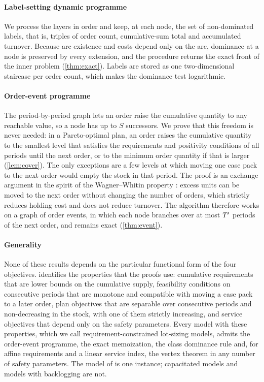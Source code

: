\documentclass[preprint,12pt,authoryear]{elsarticle}
\begin{document}
\paragraph{Label-setting dynamic programme}
We process the layers in order and keep, at each node, the set of non-dominated labels,
that is, triples of order count, cumulative-sum total and accumulated turnover. Because
arc existence and costs depend only on the arc, dominance at a node is preserved by every
extension, and the procedure returns the exact front of the inner problem
(\cref{thm:exact}). Labels are stored as one two-dimensional staircase per order count,
which makes the dominance test logarithmic.

\paragraph{Order-event programme}
The period-by-period graph lets an order raise the cumulative quantity to any reachable
value, so a node has up to $S$ successors. We prove that this freedom is never needed: in a
Pareto-optimal plan, an order raises the cumulative quantity to the smallest level that
satisfies the requirements and positivity conditions of all periods until the next order,
or to the minimum order quantity if that is larger (\cref{lem:cover}). The only exceptions
are a few levels at which moving one case pack to the next order would empty the stock in
that period. The proof is an exchange argument in the spirit of the Wagner--Whitin
property \citep{WagnerWhitin1958}: excess units can be moved to the next order without
changing the number of orders, which strictly reduces holding cost and does not reduce
turnover. The algorithm therefore works on a graph of order events, in which each node
branches over at most $T'$ periods of the next order, and remains exact
(\cref{thm:event}).

\paragraph{Generality}
None of these results depends on the particular functional form of the four objectives.
 identifies the properties that the proofs use: cumulative requirements
that are lower bounds on the cumulative supply, feasibility conditions on consecutive
periods that are monotone and compatible with moving a case pack to a later order, plan
objectives that are separable over consecutive periods and non-decreasing in the stock,
with one of them strictly increasing, and service objectives that depend only on the
safety parameters. Every model with these properties, which we call requirement-constrained
lot-sizing models, admits the order-event programme, the exact memoization, the class
dominance rule and, for affine requirements and a linear service index, the vertex theorem
in any number of safety parameters. The model of \citet{Kania2022CIE} is one instance;
capacitated models and models with backlogging are not.
\end{document}
